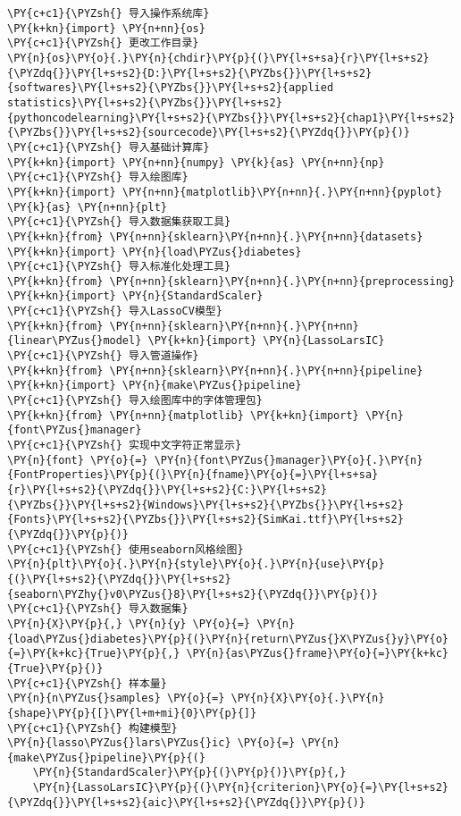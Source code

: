 \begin{Verbatim}[commandchars=\\\{\}]
\PY{c+c1}{\PYZsh{} 导入操作系统库}
\PY{k+kn}{import} \PY{n+nn}{os}
\PY{c+c1}{\PYZsh{} 更改工作目录}
\PY{n}{os}\PY{o}{.}\PY{n}{chdir}\PY{p}{(}\PY{l+s+sa}{r}\PY{l+s+s2}{\PYZdq{}}\PY{l+s+s2}{D:}\PY{l+s+s2}{\PYZbs{}}\PY{l+s+s2}{softwares}\PY{l+s+s2}{\PYZbs{}}\PY{l+s+s2}{applied statistics}\PY{l+s+s2}{\PYZbs{}}\PY{l+s+s2}{pythoncodelearning}\PY{l+s+s2}{\PYZbs{}}\PY{l+s+s2}{chap1}\PY{l+s+s2}{\PYZbs{}}\PY{l+s+s2}{sourcecode}\PY{l+s+s2}{\PYZdq{}}\PY{p}{)}
\PY{c+c1}{\PYZsh{} 导入基础计算库}
\PY{k+kn}{import} \PY{n+nn}{numpy} \PY{k}{as} \PY{n+nn}{np}
\PY{c+c1}{\PYZsh{} 导入绘图库}
\PY{k+kn}{import} \PY{n+nn}{matplotlib}\PY{n+nn}{.}\PY{n+nn}{pyplot} \PY{k}{as} \PY{n+nn}{plt}
\PY{c+c1}{\PYZsh{} 导入数据集获取工具}
\PY{k+kn}{from} \PY{n+nn}{sklearn}\PY{n+nn}{.}\PY{n+nn}{datasets} \PY{k+kn}{import} \PY{n}{load\PYZus{}diabetes}
\PY{c+c1}{\PYZsh{} 导入标准化处理工具}
\PY{k+kn}{from} \PY{n+nn}{sklearn}\PY{n+nn}{.}\PY{n+nn}{preprocessing} \PY{k+kn}{import} \PY{n}{StandardScaler}
\PY{c+c1}{\PYZsh{} 导入LassoCV模型}
\PY{k+kn}{from} \PY{n+nn}{sklearn}\PY{n+nn}{.}\PY{n+nn}{linear\PYZus{}model} \PY{k+kn}{import} \PY{n}{LassoLarsIC}
\PY{c+c1}{\PYZsh{} 导入管道操作}
\PY{k+kn}{from} \PY{n+nn}{sklearn}\PY{n+nn}{.}\PY{n+nn}{pipeline} \PY{k+kn}{import} \PY{n}{make\PYZus{}pipeline}
\PY{c+c1}{\PYZsh{} 导入绘图库中的字体管理包}
\PY{k+kn}{from} \PY{n+nn}{matplotlib} \PY{k+kn}{import} \PY{n}{font\PYZus{}manager}
\PY{c+c1}{\PYZsh{} 实现中文字符正常显示}
\PY{n}{font} \PY{o}{=} \PY{n}{font\PYZus{}manager}\PY{o}{.}\PY{n}{FontProperties}\PY{p}{(}\PY{n}{fname}\PY{o}{=}\PY{l+s+sa}{r}\PY{l+s+s2}{\PYZdq{}}\PY{l+s+s2}{C:}\PY{l+s+s2}{\PYZbs{}}\PY{l+s+s2}{Windows}\PY{l+s+s2}{\PYZbs{}}\PY{l+s+s2}{Fonts}\PY{l+s+s2}{\PYZbs{}}\PY{l+s+s2}{SimKai.ttf}\PY{l+s+s2}{\PYZdq{}}\PY{p}{)}
\PY{c+c1}{\PYZsh{} 使用seaborn风格绘图}
\PY{n}{plt}\PY{o}{.}\PY{n}{style}\PY{o}{.}\PY{n}{use}\PY{p}{(}\PY{l+s+s2}{\PYZdq{}}\PY{l+s+s2}{seaborn\PYZhy{}v0\PYZus{}8}\PY{l+s+s2}{\PYZdq{}}\PY{p}{)}
\PY{c+c1}{\PYZsh{} 导入数据集}
\PY{n}{X}\PY{p}{,} \PY{n}{y} \PY{o}{=} \PY{n}{load\PYZus{}diabetes}\PY{p}{(}\PY{n}{return\PYZus{}X\PYZus{}y}\PY{o}{=}\PY{k+kc}{True}\PY{p}{,} \PY{n}{as\PYZus{}frame}\PY{o}{=}\PY{k+kc}{True}\PY{p}{)}
\PY{c+c1}{\PYZsh{} 样本量}
\PY{n}{n\PYZus{}samples} \PY{o}{=} \PY{n}{X}\PY{o}{.}\PY{n}{shape}\PY{p}{[}\PY{l+m+mi}{0}\PY{p}{]}
\PY{c+c1}{\PYZsh{} 构建模型}
\PY{n}{lasso\PYZus{}lars\PYZus{}ic} \PY{o}{=} \PY{n}{make\PYZus{}pipeline}\PY{p}{(}
    \PY{n}{StandardScaler}\PY{p}{(}\PY{p}{)}\PY{p}{,} 
    \PY{n}{LassoLarsIC}\PY{p}{(}\PY{n}{criterion}\PY{o}{=}\PY{l+s+s2}{\PYZdq{}}\PY{l+s+s2}{aic}\PY{l+s+s2}{\PYZdq{}}\PY{p}{)}

\end{Verbatim}
